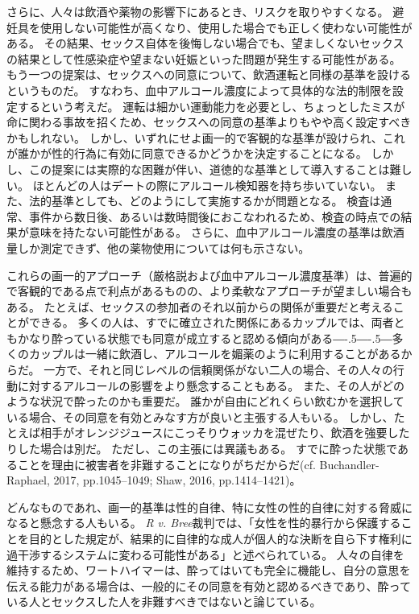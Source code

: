 \documentclass[paper=a4,book,openany]{jlreq}
\newcommand{\ig}[1]{}           %
\def\DDASH{―\kern-.5\zw―\kern-.5\zw―} %
\begin{document}
さらに、人々は飲酒や薬物の影響下にあるとき、リスクを取りやすくなる。
避妊具を使用しない可能性が高くなり、使用した場合でも正しく使わない可能性がある。
その結果、セックス自体を後悔しない場合でも、望ましくないセックスの結果として性感染症\ig{(STI)}や望まない妊娠といった問題が発生する可能性がある\citep[p.409]{george19:_alcoh_sexual_healt_behav}。
もう一つの提案は、セックスへの同意について、飲酒運転と同様の基準を設けるというものだ。
すなわち、血中アルコール濃度\ig{(BAC)}によって具体的な法的制限を設定するという考えだ。
運転は細かい運動能力を必要とし、ちょっとしたミスが命に関わる事故を招くため、セックスへの同意の基準よりもやや高く設定すべきかもしれない。
しかし、いずれにせよ画一的で客観的な基準が設けられ、これが誰かが性的行為に有効に同意できるかどうかを決定することになる。
しかし、この提案には実際的な困難が伴い、道徳的な基準として導入することは難しい。
ほとんどの人はデートの際にアルコール検知器を持ち歩いていない。
また、法的基準としても、どのようにして実施するかが問題となる。
検査は通常、事件から数日後、あるいは数時間後におこなわれるため、検査の時点での結果が意味を持たない可能性がある。
さらに、血中アルコール濃度の基準は飲酒量しか測定できず、他の薬物使用については何も示さない。

これらの画一的アプローチ（厳格説および血中アルコール濃度基準）は、普遍的で客観的である点で利点があるものの、より柔軟なアプローチが望ましい場合もある。
たとえば、セックスの参加者のそれ以前からの関係が重要だと考えることができる。
多くの人は、すでに確立された関係にあるカップルでは、両者ともかなり酔っている状態でも同意が成立すると認める傾向がある{\DDASH}多くのカップルは一緒に飲酒し、アルコールを媚薬のように利用することがあるからだ。
一方で、それと同じレベルの信頼関係がない二人の場合、その人々の行動に対するアルコールの影響をより懸念することもある。
また、その人がどのような状況で酔ったのかも重要だ。
誰かが自由にどれくらい飲むかを選択している場合、その同意を有効とみなす方が良いと主張する人もいる。
しかし、たとえば相手がオレンジジュースにこっそりウォッカを混ぜたり、飲酒を強要したりした場合は別だ。
ただし、この主張には異議もある。
すでに酔った状態であることを理由に被害者を非難することになりがちだからだ(cf. Buchandler-Raphael, 2017, pp.1045--1049; Shaw, 2016, pp.1414--1421)\nocite{buchhandler-raphael17:_conun_volun_intox_sex}\nocite{shaw16:_title_ix_sexual_assaul_issue_effec_consen}。

どんなものであれ、画一的基準は性的自律、特に女性の性的自律に対する脅威になると懸念する人もいる。
\emph{R v. Bree}裁判では、「女性を性的暴行から保護することを目的とした規定が、結果的に自律的な成人が個人的な決断を自ら下す権利に過干渉するシステムに変わる可能性がある」と述べられている。
人々の自律を維持するため、ワートハイマーは、酔ってはいても完全に機能し、自分の意思を伝える能力がある場合は、一般的にその同意を有効と認めるべきであり、酔っている人とセックスした人を非難すべきではないと論じている。
\end{document}
